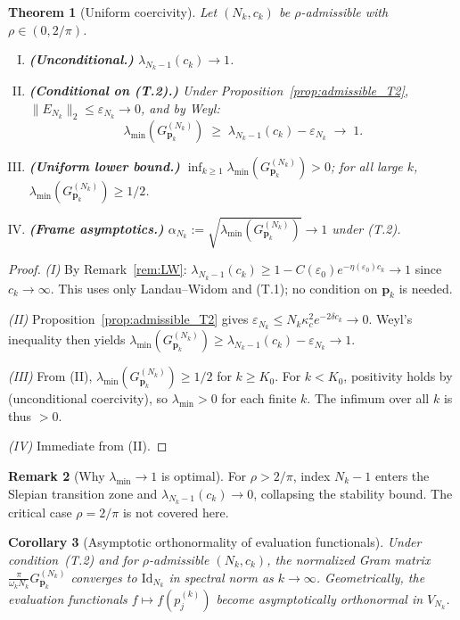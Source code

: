 \documentclass[12pt,a4paper]{amsart}
\newtheorem{theorem}{Theorem}[section]
\newtheorem{corollary}[theorem]{Corollary}
\theoremstyle{definition}
\newtheorem{remark}[theorem]{Remark}
\newcommand{\Kul}{\kappa_c}
\newcommand{\GVMk}{G^{(N_k)}_{\mathbf{p}_k}}
\newcommand{\norm}[1]{\|#1\|}
\begin{document}
\begin{theorem}[Uniform coercivity]\label{thm:coercivity}
Let $(N_k,c_k)$ be $\rho$-admissible with $\rho\in(0,2/\pi)$.
\begin{enumerate}[(I)]
\item \textbf{(Unconditional.)} $\lambda_{N_k-1}(c_k)\to1$.
\item \textbf{(Conditional on (T.2).)} Under
Proposition~\ref{prop:admissible_T2},
$\norm{E_{N_k}}_2\leq\varepsilon_{N_k}\to0$, and by Weyl:
\[
  \lambda_{\min}(\GVMk)\;\geq\;\lambda_{N_k-1}(c_k)
  -\varepsilon_{N_k}\;\to\;1.
\]
\item \textbf{(Uniform lower bound.)} $\inf_{k\geq1}
\lambda_{\min}(\GVMk)>0$; for all large $k$,
$\lambda_{\min}(\GVMk)\geq1/2$.
\item \textbf{(Frame asymptotics.)} $\alpha_{N_k}:=
\sqrt{\lambda_{\min}(\GVMk)}\to1$ under (T.2).
\end{enumerate}
\end{theorem}

\begin{proof}
\textit{(I)} By Remark~\ref{rem:LW}:
$\lambda_{N_k-1}(c_k)\geq1-C(\varepsilon_0)e^{-\eta(\varepsilon_0)c_k}\to1$
since $c_k\to\infty$. This uses only Landau--Widom and (T.1);
no condition on $\mathbf{p}_k$ is needed.

\textit{(II)} Proposition~\ref{prop:admissible_T2} gives
$\varepsilon_{N_k}\leq N_k\Kul^2 e^{-2\delta c_k}\to0$.
Weyl's inequality \cite[Thm.~4.3.1]{HornJohnson2013} then yields
$\lambda_{\min}(\GVMk)\geq\lambda_{N_k-1}(c_k)-\varepsilon_{N_k}\to1$.

\textit{(III)} From (II), $\lambda_{\min}(\GVMk)\geq1/2$ for
$k\geq K_0$. For $k<K_0$, positivity holds by
\cite[Thm.~1\,(I)]{PaperI} (unconditional coercivity),
so $\lambda_{\min}>0$ for each finite $k$.
The infimum over all $k$ is thus $>0$.

\textit{(IV)} Immediate from (II).
\end{proof}

\begin{remark}[Why $\lambda_{\min}\to1$ is optimal]\label{rem:sharp}
For $\rho>2/\pi$, index $N_k-1$ enters the Slepian transition
zone and $\lambda_{N_k-1}(c_k)\to0$, collapsing the stability
bound. The critical case $\rho=2/\pi$ is not covered here.
\end{remark}

\begin{corollary}[Asymptotic orthonormality of evaluation
                  functionals]\label{cor:gram_id}
Under condition~\textup{(T.2)} and for $\rho$-admissible $(N_k,c_k)$,
the normalized Gram matrix $\frac{\pi}{\omega_k N_k}\GVMk$
converges to $\mathrm{Id}_{N_k}$ in spectral norm as $k\to\infty$.
Geometrically, the evaluation functionals
$f\mapsto f(p_j^{(k)})$ become asymptotically orthonormal in
$V_{N_k}$.
\end{corollary}
\end{document}
